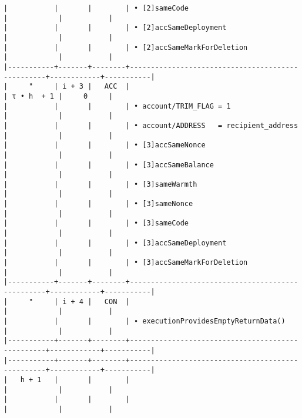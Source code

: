 \documentclass[varwidth=\maxdimen,margin=0.5cm,multi={verbatim}]{standalone}
\begin{document}
\begin{verbatim}
|           |       |        | • [2]sameCode                                    |            |           |
|           |       |        | • [2]accSameDeployment                           |            |           |
|           |       |        | • [2]accSameMarkForDeletion                      |            |           |
|-----------+-------+--------+--------------------------------------------------+------------+-----------|
|     "     | i + 3 |   ACC  |                                                  | τ • h  + 1 |     0     |
|           |       |        | • account/TRIM_FLAG = 1                          |            |           |
|           |       |        | • account/ADDRESS   = recipient_address          |            |           |
|           |       |        | • [3]accSameNonce                                |            |           |
|           |       |        | • [3]accSameBalance                              |            |           |
|           |       |        | • [3]sameWarmth                                  |            |           |
|           |       |        | • [3]sameNonce                                   |            |           |
|           |       |        | • [3]sameCode                                    |            |           |
|           |       |        | • [3]accSameDeployment                           |            |           |
|           |       |        | • [3]accSameMarkForDeletion                      |            |           |
|-----------+-------+--------+--------------------------------------------------+------------+-----------|
|     "     | i + 4 |   CON  |                                                  |            |           |
|           |       |        | ∙ executionProvidesEmptyReturnData()             |            |           |
|-----------+-------+--------+--------------------------------------------------+------------+-----------|
|-----------+-------+--------+--------------------------------------------------+------------+-----------|
|   h + 1   |       |        |                                                  |            |           |
|           |       |        |                                                  |            |           |
\end{verbatim}
\end{document}
